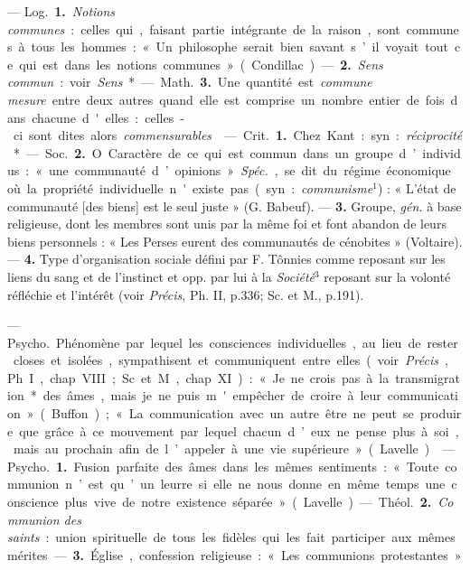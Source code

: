\begin{itemize}[leftmargin=1cm, label=, itemsep=11pt]
 — \si{Log.} {\bf 1.} {\it Notions communes} : celles qui, faisant partie intégrante de la raison, sont communes
à tous les hommes : « Un philosophe serait bien savant s’il voyait
tout ce qui est dans les notions
communes » (Condillac). — {\bf 2.} {\it Sens
commun} : voir {\it Sens}*.

— \si{Math.} {\bf 3.} Une quantité est
{\it commune mesure} entre deux autres
quand elle est comprise un nombre
entier de fois dans chacune d'elles :
celles-ci sont dites alors {\it commensurables}.

 — \si{Crit.} {\bf 1.} Chez Kant :
syn. : {\it réciprocité}*.

— \si{Soc.} {\bf 2.} O Caractère de ce qui
est commun dans un groupe d’individus : « une communauté d’opinions ». {\it Spéc.}, se dit du régime économique où la propriété individuelle n'existe pas (syn. : {\it communisme}$^1$) : « L'état de communauté
[des biens] est le seul juste » (G. Babeuf). — {\bf 3.}  Groupe,  {\it gén.} à base
religieuse, dont les membres sont
unis par la même foi et font abandon
de leurs biens personnels : « Les
Perses eurent des communautés de
cénobites » (Voltaire). — {\bf 4.} Type
d'organisation sociale défini par
F. Tônnies comme reposant sur les
liens du sang et de l'instinct et opp.
par lui à la {\it Société}$^3$ reposant sur la
volonté réfléchie et l'intérêt (voir
{\it Précis}, Ph. II, p.336; Sc. et M., p.191).

 —
\si{Psycho.} Phénomène par lequel les
consciences individuelles, au lieu de
rester closes et isolées, sympathisent
et communiquent entre elles (voir
 {\it Précis}, Ph. I, chap. VIII; Sc. et M.,
chap. XI) : « Je ne crois pas à la
transmigration* des âmes, mais je
ne puis m'empêcher de croire à leur
communication » (Buffon); « La
communication avec un autre être
ne peut se produire que grâce à ce
mouvement par lequel chacun d’eux
ne pense plus à soi, mais au prochain
afin de l’appeler à une vie supérieure » (Lavelle).

 — \si{Psycho.} {\bf 1.} Fusion parfaite des âmes dans les mêmes sentiments : « Toute communion n’est
qu’un leurre si elle ne nous donne en
même temps une conscience plus
vive de notre existence séparée »
(Lavelle).

— \si{Théol.} {\bf 2.} {\it Communion des
saints} : union spirituelle de tous les
fidèles qui les fait participer aux
mêmes mérites. — {\bf 3.} Église, confession religieuse : « Les communions
protestantes. »


\end{itemize}
